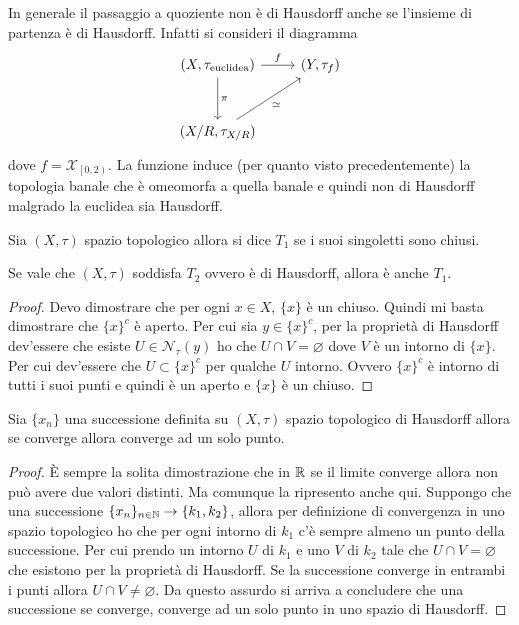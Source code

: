 \begin{remark}
	In generale il passaggio a quoziente non è di Hausdorff anche se l'insieme di partenza è di Hausdorff. Infatti si consideri il diagramma 
	\begin{equation}
	\begin{tikzcd}[row sep = 3em]
	 (X, \tau_{\text{euclidea}}) \arrow{d}{\pi}\arrow{r}{f} & (Y, \tau_f)\\
	(X/R,\tau_{X/R}) \arrow[swap]{ru}{\simeq} &
	\end{tikzcd}
	\end{equation}
	dove $f = \mathcal{X}_{\left[0,2\right)}$. La funzione induce (per quanto visto precedentemente) la topologia banale che è omeomorfa a quella banale e quindi non di Hausdorff malgrado la euclidea sia Hausdorff. 
\end{remark} 

\begin{definition}
	Sia $(X, \tau)$ spazio topologico allora si dice $T_1$ se i suoi singoletti sono chiusi. 
\end{definition}

\begin{theorem}
	Se vale che $(X, \tau)$ soddisfa $T_2$ ovvero è di Hausdorff, allora è anche $T_1$.
\end{theorem} 
\begin{proof}
	Devo dimostrare che per ogni $x\in X$, $\{x\}$ è un chiuso. Quindi mi basta dimostrare che $\{x\}^c$ è aperto. Per cui sia $y \in \{x\}^c$, per la proprietà di Hausdorff dev'essere che esiste $U \in \mathcal{N}_\tau(y)$ ho che $U \cap V = \varnothing$ dove $V$ è un intorno di $\{x\}$. Per cui dev'essere che $U \subset \{x\}^c$ per qualche $U$ intorno. Ovvero $\{x\}^c$ è intorno di tutti i suoi punti e quindi è un aperto e $\{x\}$ è un chiuso.
\end{proof}

\begin{theorem}
	Sia $\{x_n\}$ una successione definita su $(X, \tau)$ spazio topologico di Hausdorff allora se converge allora converge ad un solo punto. 
\end{theorem} 
\begin{proof}
	È sempre la solita dimostrazione che in $\mathbb{R}$ se il limite converge allora non può avere due valori distinti. Ma comunque la ripresento anche qui. Suppongo che una successione $\{x_n\}_{n \in \mathbb{N}} \rightarrow \{k_1, k_2\}$, allora per definizione di convergenza in uno spazio topologico ho che per ogni intorno di $k_1$ c'è sempre almeno un punto della successione. Per cui prendo un intorno $U$ di $k_1$ e uno $V$ di $k_2$ tale che $U \cap V = \varnothing$ che esistono per la proprietà di Hausdorff. Se la successione converge in entrambi i punti allora $U \cap V \neq \varnothing$. Da questo assurdo si arriva a concludere che una successione se converge, converge ad un solo punto in uno spazio di Hausdorff. 
\end{proof}

